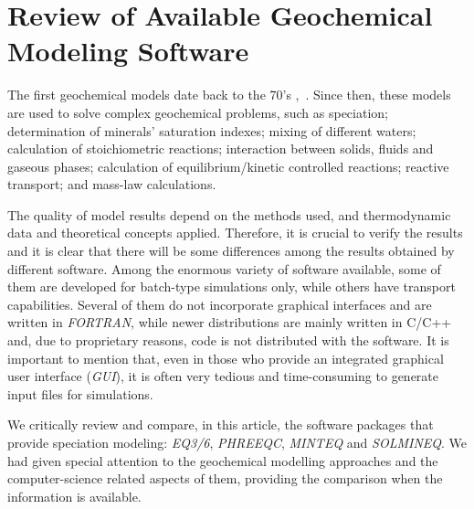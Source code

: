 

\chapter{Review of Available Geochemical Modeling Software}
\label{chapter:review}
The first geochemical models date back to the 70’s \cite{Westall:76},~\cite{Wolery:1979}. 
Since then, these models are used to solve complex geochemical problems, such as speciation; determination of minerals' saturation indexes; mixing of different waters; calculation of stoichiometric reactions; interaction between solids, fluids and gaseous phases; calculation of equilibrium/kinetic controlled reactions; reactive transport; and mass-law calculations.

The quality of model results depend on the methods used, and thermodynamic data and theoretical concepts applied. Therefore, it is crucial to verify the results and it is clear that there will be some differences among the results obtained by different software. Among the enormous variety of software available, some of them are developed for batch-type simulations only, while others have transport capabilities. Several of them do not incorporate graphical interfaces and are written in \emph{FORTRAN}, while newer distributions are mainly written in C/C++ and, due to proprietary reasons, code is not distributed with the software. It is important to mention that, even in those who provide an integrated graphical user interface (\emph{GUI}), it is often very tedious and time-consuming to generate input files for simulations.


We critically review and compare, in this article, the software packages that provide speciation modeling: \emph{EQ3/6}, \emph{PHREEQC}, \emph{MINTEQ} and \emph{SOLMINEQ}. We had given special attention to the geochemical modelling approaches and the computer-science related aspects of them, providing the comparison when the information is available. 



